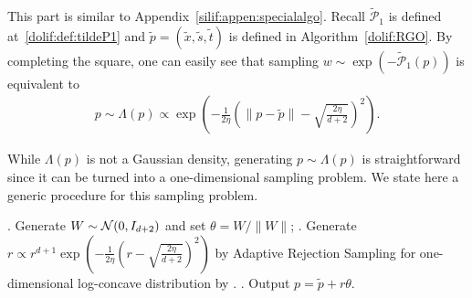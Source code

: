 \documentclass[11pt,letterpaper]{article}
\newcommand{\norm}[1]{\left\lVert #1 \right\rVert}
\newcommand{\brac}[1]{\left( #1\right)}
\begin{document}
This part is similar to Appendix~\ref{silif:appen:specialalgo}. Recall $\widetilde{\mathcal{P}}_1$ is defined at~\eqref{dolif:def:tildeP1} and $\tilde p=(\tilde x,\tilde s,\tilde t)$ is defined in Algorithm~\ref{dolif:RGO}.
By completing the square, one can easily see that sampling $w\sim \exp\brac{-\widetilde{\mathcal{P}}_1(p)}$ is equivalent to
\begin{align*}
  p\sim \Lambda(p) \propto
 \exp\brac{-\frac{1}{2\eta}\brac{\norm{ p-\tilde p}-\sqrt{\frac{2\eta}{d+2}} }^2}.
\end{align*}

While $\Lambda( p)$ is not a Gaussian density, generating $p\sim \Lambda(p)$ is straightforward since it can be turned into a one-dimensional sampling problem. We state here a generic procedure for this sampling problem. 
\begin{algorithm}[H]
	\caption{Sample $ p\sim  \Lambda( p)$ } 
	\label{dolif:alg:samplingP1}
	\begin{algorithmic}
		. Generate $W\sim {\cal N}(0,I_{d+2})$  and set $\theta = W/\|W\|$; 
		. Generate $r \propto r^{d+1} \exp\left(-\frac{1}{2\eta} \left(r - \sqrt{\frac{2\eta}{d+2}}\right)^2\right)$ by Adaptive Rejection Sampling for one-dimensional log-concave distribution by \cite{gilks1992adaptive}. 
		. Output $ p = \tilde p + r \theta$.
	\end{algorithmic}
\end{algorithm}


\end{document}
